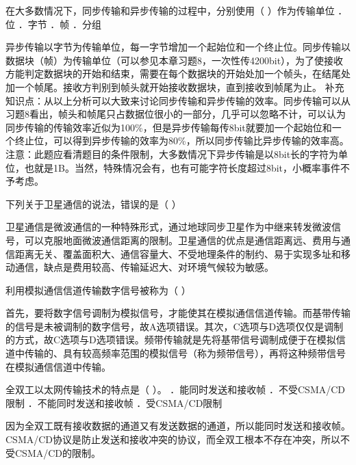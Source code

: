 \question 在大多数情况下，同步传输和异步传输的过程中，分别使用（ ）作为传输单位
．位 ．字节 ．帧 ．分组
\par{}
\begin{solution}异步传输以字节为传输单位，每一字节增加一个起始位和一个终止位。同步传输以数据块（帧）为传输单位（可以参见本章习题8，一次性传4200bit），为了使接收方能判定数据块的开始和结束，需要在每个数据块的开始处加一个帧头，在结尾处加一个帧尾。接收方判别到帧头就开始接收数据块，直到接收到帧尾为止。
补充知识点：从以上分析可以大致来讨论同步传输和异步传输的效率。同步传输可以从习题8看出，帧头和帧尾只占数据位很小的一部分，几乎可以忽略不计，可以认为同步传输的传输效率近似为100\%，但是异步传输每传8bit就要加一个起始位和一个终止位，可以得到异步传输的效率为80\%，所以同步传输比异步传输的效率高。
注意：此题应看清题目的条件限制，大多数情况下异步传输是以8bit长的字符为单位，也就是1B。当然，特殊情况会有，也有可能字符长度超过8bit，小概率事件不予考虑。
\end{solution}
\question 下列关于卫星通信的说法，错误的是（ ）
\par{}
\begin{solution}卫星通信是微波通信的一种特殊形式，通过地球同步卫星作为中继来转发微波信号，可以克服地面微波通信距离的限制。卫星通信的优点是通信距离远、费用与通信距离无关、覆盖面积大、通信容量大、不受地理条件的制约、易于实现多址和移动通信，缺点是费用较高、传输延迟大、对环境气候较为敏感。
\end{solution}
\question 利用模拟通信信道传输数字信号被称为（ ）
\par{}
\begin{solution}首先，要将数字信号调制为模拟信号，才能使其在模拟通信信道传输。而基带传输的信号是未被调制的数字信号，故A选项错误。其次，C选项与D选项仅仅是调制的方式，故C选项与D选项错误。频带传输就是先将基带信号调制成便于在模拟信道中传输的、具有较高频率范围的模拟信号（称为频带信号），再将这种频带信号在模拟通信信道中传输。
\end{solution}
\question 全双工以太网传输技术的特点是（ ）。 ．能同时发送和接收帧
．不受CSMA/CD限制 ．不能同时发送和接收帧 ．受CSMA/CD限制
\par{}
\begin{solution}因为全双工既有接收数据的通道又有发送数据的通道，所以能同时发送和接收帧。CSMA/CD协议是防止发送和接收冲突的协议，而全双工根本不存在冲突，所以不受CSMA/CD的限制。
\end{solution}
